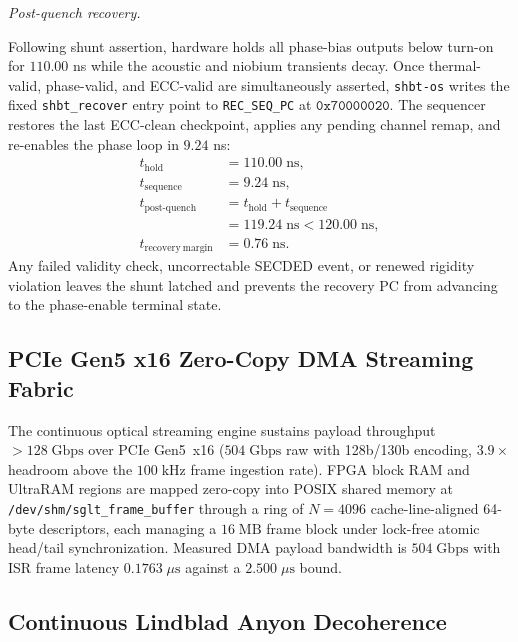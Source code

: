 \documentclass[10pt,twocolumn]{IEEEtran}
\newcommand{\shbtos}{\texttt{shbt-os}}
\begin{document}
\noindent\textit{Post-quench recovery.}

Following shunt assertion, hardware holds all phase-bias outputs below turn-on
for $110.00$ ns while the acoustic and niobium transients decay.  Once
thermal-valid, phase-valid, and ECC-valid are simultaneously asserted,
\shbtos{} writes the fixed \texttt{shbt\_recover} entry point to
\texttt{REC\_SEQ\_PC} at $\mathtt{0x70000020}$.  The sequencer restores the
last ECC-clean checkpoint, applies any pending channel remap, and re-enables
the phase loop in $9.24$ ns:
\begin{equation}
\begin{aligned}
t_{\mathrm{hold}}&=110.00\;\mathrm{ns}, \\
t_{\mathrm{sequence}}&=9.24\;\mathrm{ns}, \\
t_{\mathrm{post\text{-}quench}}
&=t_{\mathrm{hold}}+t_{\mathrm{sequence}} \\
&=119.24\;\mathrm{ns}<120.00\;\mathrm{ns}, \\
t_{\mathrm{recovery\ margin}}&=0.76\;\mathrm{ns}.
\end{aligned}
\label{eq:sec5_recovery_timeline}
\end{equation}
Any failed validity check, uncorrectable SECDED event, or renewed rigidity violation leaves the shunt latched and prevents the recovery PC from advancing to the phase-enable terminal state.

\subsection{PCIe Gen5 x16 Zero-Copy DMA Streaming Fabric}
\label{sec:dma_fabric}

The continuous optical streaming engine sustains payload throughput
$>128\;\mathrm{Gbps}$ over PCIe Gen5~x16 ($504\;\mathrm{Gbps}$ raw with
128b/130b encoding, $3.9\times$ headroom above the $100\;\mathrm{kHz}$
frame ingestion rate). FPGA block RAM and UltraRAM regions are mapped
zero-copy into POSIX shared memory at
\texttt{/dev/shm/sglt\_frame\_buffer} through a ring of $N=4096$
cache-line-aligned 64-byte descriptors, each managing a
$16\;\mathrm{MB}$ frame block under lock-free atomic head/tail
synchronization. Measured DMA payload bandwidth is $504\;\mathrm{Gbps}$
with ISR frame latency $0.1763\;\mu\mathrm{s}$ against a
$2.500\;\mu\mathrm{s}$ bound.

\subsection{Continuous Lindblad Anyon Decoherence}
\label{sec:lindblad}
\end{document}
